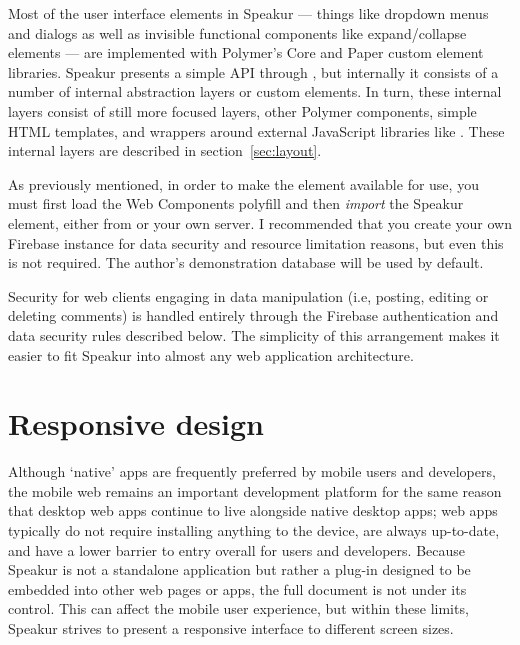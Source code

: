Most of the user interface elements in Speakur 
--- things like dropdown menus and dialogs as well as invisible functional components like expand/collapse elements  
--- are implemented with Polymer's Core and Paper custom element libraries.
Speakur presents a simple API through ,
but internally it consists of a number of internal abstraction layers or custom elements.
In turn, these internal layers consist of still more focused layers, other Polymer components, 
simple HTML templates, 
and wrappers around external JavaScript libraries 
like .
These internal layers are described in section~\ref{sec:layout}.

As previously mentioned, in order to make the 
 element available for use, 
you must first load the Web Components polyfill and then \textit{import} the Speakur element, 
either from  or your own server.
I recommended that you create your own Firebase instance for data security and resource limitation reasons, but even this is not required. 
The author's demonstration database will be used by default.

Security for web clients engaging in data manipulation 
(i.e, posting, editing or deleting comments) 
is handled entirely through the Firebase authentication 
and data security rules described below.
The simplicity of this arrangement makes it easier to fit Speakur into almost any web application architecture.

\section{Responsive design}
\label{bg:mobile}
Although `native' apps are frequently preferred by mobile users and developers, 
the mobile web remains an important development platform for the same reason that 
desktop web apps continue to live alongside native desktop apps; 
web apps typically do not require installing anything to the device, are always up-to-date, and have a lower barrier to entry overall for users and developers.
Because Speakur is not a standalone application but rather a plug-in designed to be embedded into other web pages or apps, 
the full document is not under its control.
This can affect the mobile user experience,
but within these limits, Speakur strives to present a responsive interface to different screen sizes.

